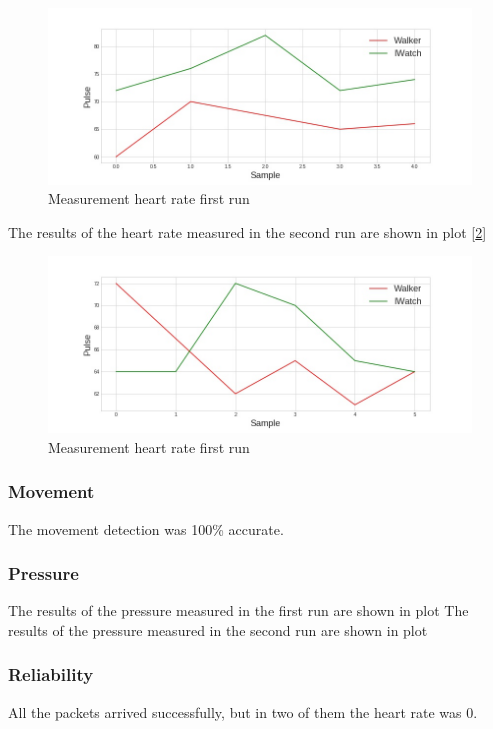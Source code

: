 			\begin{figure}[h]
				\centering
				\includegraphics[width=1.1\linewidth]{gfx/pulse_run1_diff.jpg}
				\caption{Measurement heart rate first run}
				\label{fig:HeartRateFirst}
			\end{figure}
			
			The results of the heart rate measured in the second run are shown in plot [\ref{fig:HeartRateSecond}]

			\begin{figure}[h]
				\centering
				\includegraphics[width=1.1\linewidth]{gfx/pulse_run2_diff.jpg}
				\caption{Measurement heart rate first run}
				\label{fig:HeartRateSecond}
			\end{figure}

		\subsubsection{Movement}
			The movement detection was 100\% accurate.

		\subsubsection{Pressure}
			The results of the pressure measured in the first run are shown in plot%
			The results of the pressure measured in the second run are shown in plot%
		\subsubsection{Reliability}
			All the packets arrived successfully, but in two of them the heart rate was 0.

